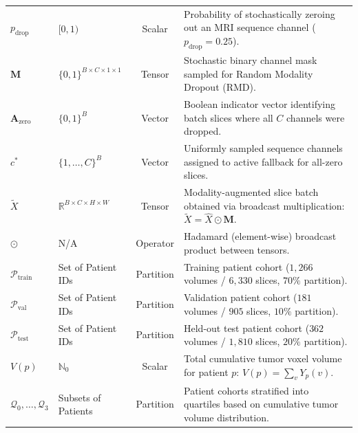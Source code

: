 \documentclass{article}
\begin{document}
\begin{table}[ht]
{\begin{tabular}{llcp{8.2cm}}
$p_{\text{drop}}$ & $[0, 1)$ & Scalar & Probability of stochastically zeroing out an MRI sequence channel ($p_{\text{drop}} = 0.25$). \\
$\mathbf{M}$ & $\{0, 1\}^{B \times C \times 1 \times 1}$ & Tensor & Stochastic binary channel mask sampled for Random Modality Dropout (RMD). \\
$\mathbf{A}_{\text{zero}}$ & $\{0, 1\}^B$ & Vector & Boolean indicator vector identifying batch slices where all $C$ channels were dropped. \\
$c^*$ & $\{1, \dots, C\}^B$ & Vector & Uniformly sampled sequence channels assigned to active fallback for all-zero slices. \\
$\tilde{X}$ & $\mathbb{R}^{B \times C \times H \times W}$ & Tensor & Modality-augmented slice batch obtained via broadcast multiplication: $\tilde{X} = \hat{X} \odot \mathbf{M}$. \\
$\odot$ & N/A & Operator & Hadamard (element-wise) broadcast product between tensors. \\
$\mathcal{P}_{\text{train}}$ & Set of Patient IDs & Partition & Training patient cohort ($1,266$ volumes / $6,330$ slices, $70\%$ partition). \\
$\mathcal{P}_{\text{val}}$ & Set of Patient IDs & Partition & Validation patient cohort ($181$ volumes / $905$ slices, $10\%$ partition). \\
$\mathcal{P}_{\text{test}}$ & Set of Patient IDs & Partition & Held-out test patient cohort ($362$ volumes / $1,810$ slices, $20\%$ partition). \\
$V(p)$ & $\mathbb{N}_0$ & Scalar & Total cumulative tumor voxel volume for patient $p$: $V(p) = \sum_{v} Y_p(v)$. \\
$\mathcal{Q}_0, \dots, \mathcal{Q}_3$ & Subsets of Patients & Partition & Patient cohorts stratified into quartiles based on cumulative tumor volume distribution. \\
\bottomrule
\end{tabular}%
}
\end{table}
\end{document}
